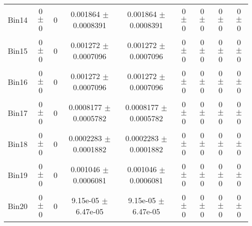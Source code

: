\begin{tabular}{@{\extracolsep{4pt}}lcccccccc@{}}
     Bin14 & 0 $\pm$ 0 & 0 & 0.001864 $\pm$ 0.0008391 & 0.001864 $\pm$ 0.0008391 & 0 $\pm$ 0 & 0 $\pm$ 0 & 0 $\pm$ 0 & 0 $\pm$ 0 \\ 
     Bin15 & 0 $\pm$ 0 & 0 & 0.001272 $\pm$ 0.0007096 & 0.001272 $\pm$ 0.0007096 & 0 $\pm$ 0 & 0 $\pm$ 0 & 0 $\pm$ 0 & 0 $\pm$ 0 \\ 
     Bin16 & 0 $\pm$ 0 & 0 & 0.001272 $\pm$ 0.0007096 & 0.001272 $\pm$ 0.0007096 & 0 $\pm$ 0 & 0 $\pm$ 0 & 0 $\pm$ 0 & 0 $\pm$ 0 \\ 
     Bin17 & 0 $\pm$ 0 & 0 & 0.0008177 $\pm$ 0.0005782 & 0.0008177 $\pm$ 0.0005782 & 0 $\pm$ 0 & 0 $\pm$ 0 & 0 $\pm$ 0 & 0 $\pm$ 0 \\ 
     Bin18 & 0 $\pm$ 0 & 0 & 0.0002283 $\pm$ 0.0001882 & 0.0002283 $\pm$ 0.0001882 & 0 $\pm$ 0 & 0 $\pm$ 0 & 0 $\pm$ 0 & 0 $\pm$ 0 \\ 
     Bin19 & 0 $\pm$ 0 & 0 & 0.001046 $\pm$ 0.0006081 & 0.001046 $\pm$ 0.0006081 & 0 $\pm$ 0 & 0 $\pm$ 0 & 0 $\pm$ 0 & 0 $\pm$ 0 \\ 
     Bin20 & 0 $\pm$ 0 & 0 & 9.15e-05 $\pm$ 6.47e-05 & 9.15e-05 $\pm$ 6.47e-05 & 0 $\pm$ 0 & 0 $\pm$ 0 & 0 $\pm$ 0 & 0 $\pm$ 0 \\ 
\hline\hline
  \end{tabular}
